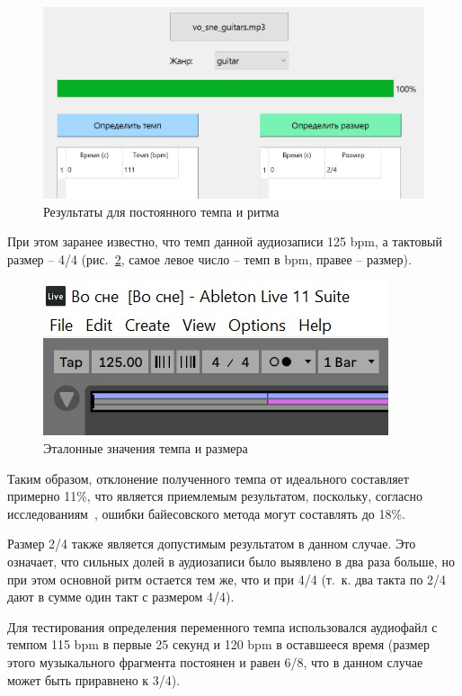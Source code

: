 \begin{figure}[h]
	\centering
	\includegraphics[scale=0.9]{inc/img/test_constant.jpg}
	\caption{Результаты для постоянного темпа и ритма}
	\label{img:test_const}
\end{figure}

\newpage

При этом заранее известно, что темп данной аудиозаписи 125 bpm, а тактовый размер -- 4/4 (рис.~\ref{img:vosne_ref}, самое левое число -- темп в bpm, правее -- размер).

\begin{figure}[h]
	\centering
	\includegraphics[scale=1.4]{inc/img/vosne_ref.jpg}
	\caption{Эталонные значения темпа и размера}
	\label{img:vosne_ref}
\end{figure}

Таким образом, отклонение полученного темпа от идеального составляет примерно 11\%, что является приемлемым результатом, поскольку, согласно исследованиям~\cite{bayesian}, ошибки байесовского метода могут составлять до 18\%.

Размер 2/4 также является допустимым результатом в данном случае. Это означает, что сильных долей в аудиозаписи было выявлено в два раза больше, но при этом основной ритм остается тем же, что и при 4/4 (т.~к. два такта по 2/4 дают в сумме один такт с размером 4/4).

Для тестирования определения переменного темпа использовался аудиофайл с темпом 115 bpm в первые 25 секунд и 120 bpm в оставшееся время (размер этого музыкального фрагмента постоянен и равен 6/8, что в данном случае может быть приравнено к 3/4).

